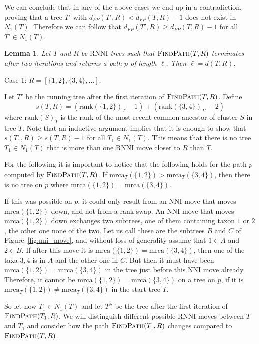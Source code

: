 \documentclass{amsart}
\newtheorem{lemma}{Lemma}
\newcommand{\rnni}{\mathrm{RNNI}}
\newcommand{\findpath}{\textsc{FindPath}}
\newcommand{\mrca}{\mathrm{mrca}}
\newcommand{\rank}{\mathrm{rank}}
\newcommand{\nni}{\mathrm{NNI}}
\begin{document}
We can conclude that in any of the above cases we end up in a contradiction, proving that a tree $T'$ with $d_{FP}(T',R) < d_{FP}(T,R) - 1$ does not exist in $N_1(T)$.
Therefore we can follow that $d_{FP}(T',R) \geq d_{FP}(T,R) -1$ for all $T' \in N_1(T)$.
\endproof

\begin{lemma}
Let $T$ and $R$ be $\rnni$ trees such that $\findpath(T, R)$ terminates after two iterations and returns a path $p$ of length $\ell$.
Then $\ell = d(T, R)$.
\end{lemma}

\proof
Case 1: $R = [\{1, 2\}, \{3, 4\}, \ldots]$.

Let $T'$ be the running tree after the first iteration of $\findpath(T, R)$.
Define
\[
s(T, R) = (\rank(\{1,2\})_T - 1) + (\rank(\{3,4\})_{T'} - 2)
\]
where $\rank(S)_T$ is the rank of the most recent common ancestor of cluster $S$ in tree $T$.
Note that an inductive argument implies that it is enough to show that $s(T_1, R) \geq s(T, R) - 1$ for all $T_1 \in N_1(T)$.
This means that there is no tree $T_1 \in N_1(T)$ that is more than one $\rnni$ move closer to $R$ than $T$.

For the following it is important to notice that the following holds for the path $p$ computed by $\findpath(T,R)$.
If $\mrca_T(\{1,2\}) > \mrca_T(\{3,4\})$, then there is no tree on $p$ where $\mrca(\{1,2\}) = \mrca(\{3,4\})$.

If this was possible on $p$, it could only result from an $\nni$ move that moves $\mrca(\{1,2\})$ down, and not from a rank swap.
An $\nni$ move that moves $\mrca(\{1,2\})$ down exchanges two subtrees, one of them containing taxon $1$ or $2$, the other one none of the two.
Let us call these are the subtrees $B$ and $C$ of Figure~\ref{fig:nni_move}, and without loss of generality assume that $1 \in A$ and $2 \in B$.
If after this move it is $\mrca(\{1,2\}) = \mrca(\{3,4\})$, then one of the taxa $3,4$ is in $A$ and the other one in $C$.
But then it must have been $\mrca(\{1,2\}) = \mrca(\{3,4\})$ in the tree just before this $\nni$ move already.
Therefore, it cannot be $\mrca(\{1,2\}) = \mrca(\{3,4\})$ on a tree on $p$, if it is $\mrca_T(\{1,2\}) \neq \mrca_T(\{3,4\})$ in the start tree $T$.

So let now $T_1 \in N_1(T)$ and let $T''$ be the tree after the first iteration of $\findpath(T_1,R)$. We will distinguish different possible $\rnni$ moves between $T$ and $T_1$ and consider how the path $\findpath(T_1,R)$ changes compared to $\findpath(T,R)$.
\end{document}
